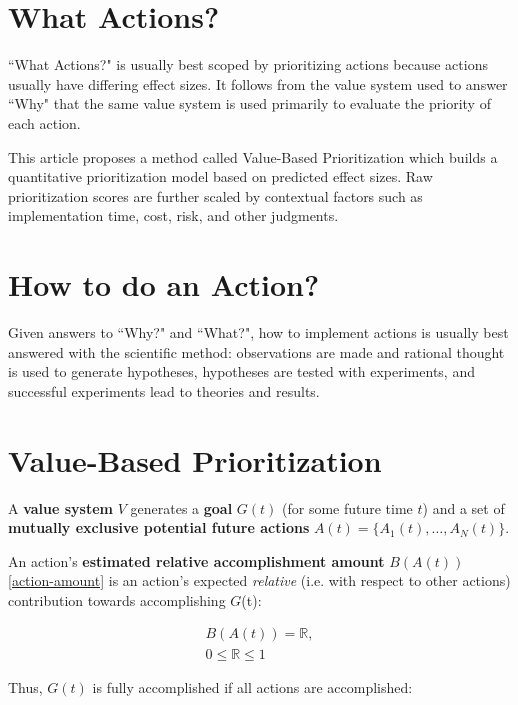 \documentclass[12pt, a4paper, twocolumn]{article}
\begin{document}
\section{What Actions?}

``What Actions?" is usually best scoped by prioritizing actions because actions usually have differing effect sizes. It follows from the value system used to answer ``Why" that the same value system is used primarily to evaluate the priority of each action.

This article proposes a method called Value-Based Prioritization which builds a quantitative prioritization model based on predicted effect sizes. Raw prioritization scores are further scaled by contextual factors such as implementation time, cost, risk, and other judgments.

\section{How to do an Action?}

Given answers to ``Why?" and ``What?", how to implement actions is usually best answered with the scientific method\cite{scientific-method}: observations are made and rational thought is used to generate hypotheses, hypotheses are tested with experiments, and successful experiments lead to theories and results.

\section{Value-Based Prioritization}

A \textbf{value system} $V$ generates a \textbf{goal} $G(t)$ (for some future time $t$) and a set of \textbf{mutually exclusive potential future actions} $A(t) = \{A_1(t), \ldots, A_N(t)\}$.

An action's \textbf{estimated relative accomplishment amount} $B(A(t))$ \eqref{action-amount} is an action's expected \textit{relative} (i.e. with respect to other actions) contribution towards accomplishing $G$(t):

\begin{equation}\label{action-amount}
  \begin{gathered}
B(A(t)) = \mathbb{R}, \\
0 \leq \mathbb{R} \leq 1
  \end{gathered}
\end{equation}

Thus, $G(t)$ is fully accomplished if all actions are accomplished:
\end{document}
